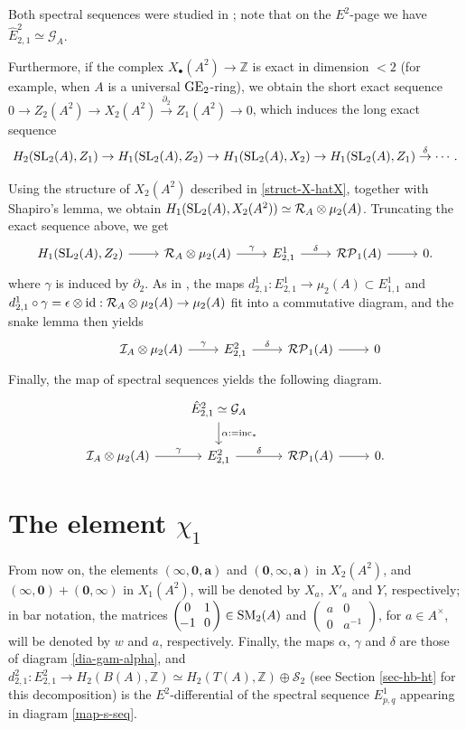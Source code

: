 \documentclass[11pt]{amsart}
\theoremstyle{definition}
\theoremstyle{plain}
\theoremstyle{definition}
\numberwithin{equation}{section}
\newcommand{\z}{\mathbb{Z}}
\newcommand{\GG}{\mathcal{G}}
\newcommand{\RR}{\mathcal{R}}
\newcommand{\II}{\mathcal{I}}
\newcommand{\RP}{\mathcal{RP}}
\renewcommand{\SS}{\mathcal{S}}
\renewcommand{\aa}{{A^\times}}
\newcommand{\GE}{{\rm GE}}
\newcommand{\SL}{\mathit{{\rm SL}}}
\newcommand{\SM}{\mathit{{\rm SM}}}
\newcommand{\id}{{\rm id}}
\newcommand{\inc}{{\rm inc}}
\newcommand{\mtxx}[4]
{\left(\!\!
	\begin{array}{cc}
		\!\!#1 & \!\!#2\\
		\!\!#3 & \!\!#4
	\end{array}\!\!
	\right)}
\begin{document}
	Both spectral sequences were studied in \cite[\S 1 and \S 5]{B-E--2023}; note that on the $E^2$-page we have $\hat{E}^2_{2,1}\simeq\GG_A$. 
	
	Furthermore, if the complex $X_{\bullet}(A^2)\to\z$ is exact in dimension $<2$ (for example, when $A$ is a universal $\GE_2$-ring), we obtain the short exact sequence $0\to Z_2(A^2)\to X_2(A^2) \overset{\partial_2}{\to} Z_1(A^2)\to 0$, which induces the long exact sequence
	\begin{equation}\label{long-eseq}
		H_2(\SL_2(A),Z_1) \to H_1(\SL_2(A),Z_2) \to H_1(\SL_2(A),X_2)\to H_1(\SL_2(A),Z_1)\overset{\delta}{\to} \cdots.
	\end{equation}
	
	Using the structure of $X_2(A^2)$ described in \eqref{struct-X-hatX}, together with Shapiro's lemma, we obtain $H_1(\SL_2(A),X_2(A^2))\simeq\RR_A\otimes\mu_2(A)$. Truncating the exact sequence above, we get
	\[
	\begin{tikzcd}
		H_1(\SL_2(A),Z_2) \ar[r] & \RR_A\otimes\mu_2(A)\ar[r,"\gamma"] & E^1_{2,1} \ar[r,"\delta"] & \RP_1(A)\ar[r] & 0.
	\end{tikzcd}
	\]
	where $\gamma$ is induced by $\partial_2$. As in \cite[\S 4]{B-E--2023}, the maps $d^1_{2,1}:E^1_{2,1}\to\mu_2(A)\subset E^1_{1,1}$ and $d^1_{2,1}\circ\gamma=\epsilon\otimes\id:\RR_A\otimes\mu_2(A)\to\mu_2(A)$ fit into a commutative diagram, and the snake lemma then yields
	\[
	\begin{tikzcd}
		&\II_A\otimes\mu_2(A)\ar[r,"\gamma"] & E^2_{2,1} \ar[r,"\delta"] & \RP_1(A)\ar[r] & 0 
	\end{tikzcd}
	\]
	Finally, the map of spectral sequences yields the following diagram.
	\begin{equation}\label{dia-gam-alpha}
		\begin{tikzcd}
			& \hat{E}^2_{2,1}\simeq\GG_A\ar[d,"\alpha:=\inc_*"] & &\\
			\II_A\otimes\mu_2(A)\ar[r,"\gamma"] & E^2_{2,1} \ar[r,"\delta"] & \RP_1(A)\ar[r] & 0.
		\end{tikzcd}
	\end{equation}
	\section{The element \texorpdfstring{$\chi_1$}{X1}}
	From now on, the elements $(\pmb{\infty},\pmb{0},\pmb{a})$ and $(\pmb{0},\pmb{\infty},\pmb{a})$ in $X_2(A^2)$, and $(\pmb{\infty},\pmb{0})+(\pmb{0},\pmb{\infty})$ in $X_1(A^2)$, will be denoted by $X_a$, $X'_a$ and $Y$, respectively; in bar notation, the matrices $\mtxx{0}{1}{-1}{0}\in\SM_2(A)$ and $\mtxx{a}{0}{0}{a^{-1}}$, for $a\in\aa$, will be denoted by $w$ and $a$, respectively. Finally, the maps $\alpha$, $\gamma$ and $\delta$ are those of diagram \eqref{dia-gam-alpha}, and $d^2_{2,1}:E^2_{2,1}\to H_2(B(A),\z)\simeq H_2(T(A),\z)\oplus\SS_2$ (see Section \ref{sec-hb-ht} for this decomposition) is the $E^2$-differential of the spectral sequence $E^1_{p,q}$ appearing in diagram \eqref{map-s-seq}. 
	
\end{document}
